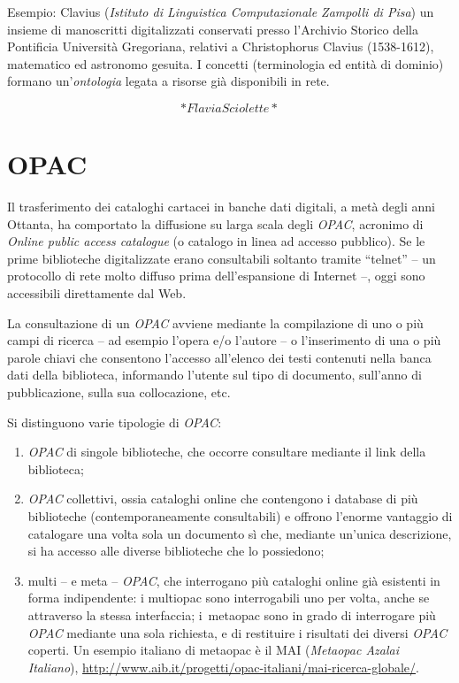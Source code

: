 \documentclass[
  b5paper,
  twoside,
  11pt,
  chapterprefix=false,
  bibliography=totocnumbered,
  listof=flat]{scrbook}
\begin{document}
Esempio: Clavius (\emph{Istituto di Linguistica Computazionale Zampolli di
Pisa}) un insieme di manoscritti digitalizzati conservati presso
l'Archivio Storico della Pontificia Università Gregoriana, relativi a
Christophorus Clavius (1538-1612), matematico ed astronomo gesuita. I
concetti (terminologia ed entità di dominio) formano un'\emph{ontologia}
legata a risorse già disponibili in rete.

\[*Flavia Sciolette*\]

\hypertarget{opac}{%
\chapter{OPAC}\label{opac}}

Il trasferimento dei cataloghi cartacei in banche dati digitali, a metà
degli anni Ottanta, ha comportato la diffusione su larga scala degli
\emph{OPAC}, acronimo di \emph{Online public access catalogue} (o catalogo in
linea ad accesso pubblico). Se le prime biblioteche digitalizzate erano
consultabili soltanto tramite \enquote{telnet} -- un protocollo di rete molto
diffuso prima dell'espansione di Internet --, oggi sono accessibili
direttamente dal Web.

La consultazione di un \emph{OPAC} avviene mediante la compilazione di uno o
più campi di ricerca -- ad esempio l'opera e/o l'autore -- o
l'inserimento di una o più parole chiavi che consentono l'accesso
all'elenco dei testi contenuti nella banca dati della biblioteca,
informando l'utente sul tipo di documento, sull'anno di pubblicazione,
sulla sua collocazione, etc.

Si distinguono varie tipologie di \emph{OPAC}:

\begin{enumerate}
\def\labelenumi{\arabic{enumi}.}
\item
  \emph{OPAC} di singole biblioteche, che occorre consultare mediante il
  link della biblioteca;
\item
  \emph{OPAC} collettivi, ossia cataloghi online che contengono i database
  di più biblioteche (contemporaneamente consultabili) e offrono
  l'enorme vantaggio di catalogare una volta sola un documento sì che,
  mediante un'unica descrizione, si ha accesso alle diverse
  biblioteche che lo possiedono;
\item
  multi -- e meta -- \emph{OPAC}, che interrogano più cataloghi online già
  esistenti in forma indipendente: i multiopac sono interrogabili uno
  per volta, anche se attraverso la stessa interfaccia; i~metaopac
  sono in grado di interrogare più \emph{OPAC} mediante una sola richiesta,
  e di restituire i risultati dei diversi \emph{OPAC} coperti. Un esempio
  italiano di metaopac è il MAI (\emph{Metaopac Azalai Italiano}),
  \href{http://www.aib.it/progetti/opac-italiani/mai-ricerca-globale/}{{http://www.aib.it/progetti/opac-italiani/mai-ricerca-globale/}}.
\end{enumerate}
\end{document}
